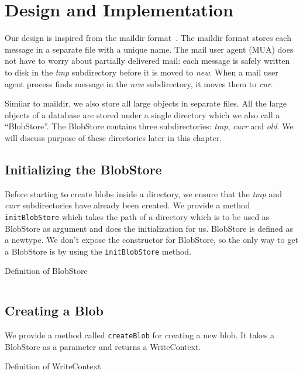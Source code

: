 \chapter{Design and Implementation}
\label{chap:design}

Our design is inspired from the maildir format~\cite{bernstein1995using}. The maildir format stores each message in a separate file with a unique name. The mail user agent (MUA) does not have to worry about partially delivered mail: each message is safely written to disk in the \textit{tmp} subdirectory before it is moved to \textit{new}. When a mail user agent process finds message in the \textit{new} subdirectory, it moves them to \textit{cur}.

Similar to maildir, we also store all large objects in separate files. All the large objects of a database are stored under a single directory which we also call a ``BlobStore''.
The BlobStore contains three subdirectories: \textit{tmp}, \textit{curr} and \textit{old}. We will discuss purpose of these directories later in this chapter.

\section{Initializing the BlobStore}
Before starting to create blobs inside a directory, we ensure that the \textit{tmp} and \textit{curr} subdirectories have already been created. We provide a method \texttt{initBlobStore} which takes the path of a directory which is to be used as BlobStore as argument and does the initialization for us.
BlobStore is defined as a newtype. We don't expose the constructor for BlobStore, so the only way to get a BlobStore is by using the \texttt{initBlobStore} method.

\begin{program}
  \caption{Definition of BlobStore}
  \label{prog:defblobstore}
  \inputminted{haskell}{hs/blobstore.hs}
\end{program}

\section{Creating a Blob}
We provide a method called \texttt{createBlob} for creating a new blob. It takes a BlobStore as a parameter and returns a WriteContext.

\begin{program}
  \caption{Definition of WriteContext}
  \label{prog:defwritecontext}
  \inputminted{haskell}{hs/writecontext.hs}
\end{program}

